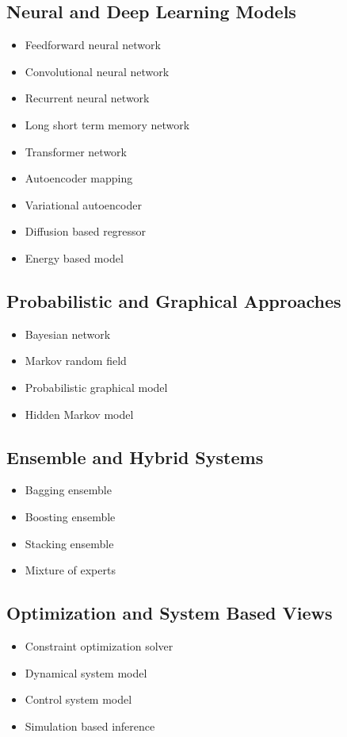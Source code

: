 \documentclass{article}
\begin{document}
\subsection*{Neural and Deep Learning Models}
\begin{itemize}
\item Feedforward neural network
\item Convolutional neural network
\item Recurrent neural network
\item Long short term memory network
\item Transformer network
\item Autoencoder mapping
\item Variational autoencoder
\item Diffusion based regressor
\item Energy based model
\end{itemize}

\subsection*{Probabilistic and Graphical Approaches}
\begin{itemize}
\item Bayesian network
\item Markov random field
\item Probabilistic graphical model
\item Hidden Markov model
\end{itemize}

\subsection*{Ensemble and Hybrid Systems}
\begin{itemize}
\item Bagging ensemble
\item Boosting ensemble
\item Stacking ensemble
\item Mixture of experts
\end{itemize}

\subsection*{Optimization and System Based Views}
\begin{itemize}
\item Constraint optimization solver
\item Dynamical system model
\item Control system model
\item Simulation based inference
\end{itemize}
\end{document}

